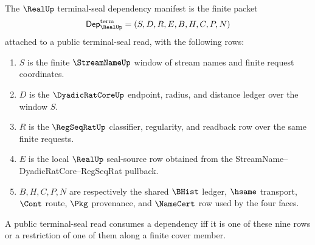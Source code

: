 \begin{definition}
\label{def:real-terminal-seal-dependency-manifest}
The $\RealUp$ terminal-seal dependency manifest is the finite packet
$$
\mathsf{Dep}_{\RealUp}^{\mathrm{term}}
  =(S,D,R,E,B,H,C,P,N)
$$
attached to a public terminal-seal read, with the following rows:
\begin{enumerate}
\item $S$ is the finite $\StreamNameUp$ window of stream names and finite
request coordinates.
\item $D$ is the $\DyadicRatCoreUp$ endpoint, radius, and distance ledger over
the window $S$.
\item $R$ is the $\RegSeqRatUp$ classifier, regularity, and readback row over
the same finite requests.
\item $E$ is the local $\RealUp$ seal-source row obtained from the
StreamName--DyadicRatCore--RegSeqRat pullback.
\item $B,H,C,P,N$ are respectively the shared $\BHist$ ledger, $\hsame$
transport, $\Cont$ route, $\Pkg$ provenance, and $\NameCert$ row used by the
four faces.
\end{enumerate}

A public terminal-seal read consumes a dependency iff it is one of these nine
rows or a restriction of one of them along a finite cover member.
\end{definition}

